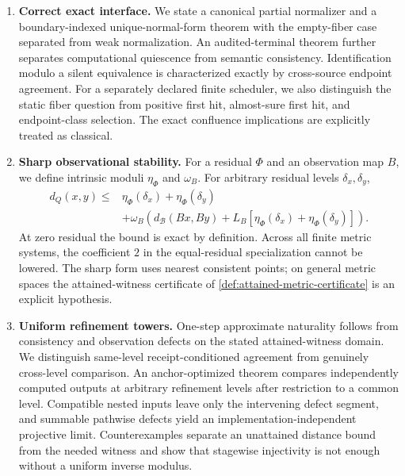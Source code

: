 \documentclass[11pt]{article}
\theoremstyle{definition}
\theoremstyle{remark}
\numberwithin{equation}{section}
\newcommand{\cB}{\mathcal B}
\begin{document}
\begin{enumerate}[label=\textbf{C\arabic*.},leftmargin=3.2em]
\item \textbf{Correct exact interface.}
We state a canonical partial normalizer and a boundary-indexed unique-normal-form theorem with the empty-fiber case separated from weak normalization.  An audited-terminal theorem further separates computational quiescence from semantic consistency.  Identification modulo a silent equivalence is characterized exactly by cross-source endpoint agreement.  For a separately declared finite scheduler, we also distinguish the static fiber question from positive first hit, almost-sure first hit, and endpoint-class selection.  The exact confluence implications are explicitly treated as classical.

\item \textbf{Sharp observational stability.}
For a residual $\Phi$ and an observation map $B$, we define intrinsic moduli $\eta_\Phi$ and $\omega_B$.  For arbitrary residual levels $\delta_x,\delta_y$,
\begin{equation}\label{eq:intro-master}
\begin{split}
 d_Q(x,y)\le{}&\eta_\Phi(\delta_x)+\eta_\Phi(\delta_y)\\
 &+\omega_B\!\left(
 d_{\cB}(Bx,By)+L_B[\eta_\Phi(\delta_x)+\eta_\Phi(\delta_y)]
 \right).
\end{split}
\end{equation}
At zero residual the bound is exact by definition.  Across all finite metric systems, the coefficient $2$ in the equal-residual specialization cannot be lowered.
The sharp form uses nearest consistent points; on general metric spaces the
attained-witness certificate of \cref{def:attained-metric-certificate} is an
explicit hypothesis.

\item \textbf{Uniform refinement towers.}
One-step approximate naturality follows from consistency and observation defects on the stated attained-witness domain.  We distinguish same-level receipt-conditioned agreement from genuinely cross-level comparison.  An anchor-optimized theorem compares independently computed outputs at arbitrary refinement levels after restriction to a common level.  Compatible nested inputs leave only the intervening defect segment, and summable pathwise defects yield an implementation-independent projective limit.  Counterexamples separate an unattained distance bound from the needed witness and show that stagewise injectivity is not enough without a uniform inverse modulus.


\end{enumerate}
\end{document}
